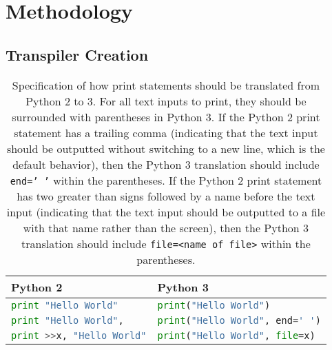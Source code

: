 \section{Methodology}

\subsection{Transpiler Creation}
\begin{table*}[b!]
    \begin{tabular}{@{}l|l@{}}
    \toprule
    Python 2             & Python 3              \\ \midrule
    \lstinline[language=Python, style=pythonstyle]|print "Hello World"|  & \lstinline[language=Python, style=pythonstyle]|print("Hello World")|  \\
    \lstinline[language=Python, style=pythonstyle]|print "Hello World",| & \lstinline[language=Python, style=pythonstyle]|print("Hello World", end=' ')| \\
    \lstinline[language=Python, style=pythonstyle]|print >>x, "Hello World"|       & \lstinline[language=Python, style=pythonstyle]|print("Hello World", file=x)|\\  \bottomrule      
    \end{tabular}
    \caption{Specification of how print statements should be translated from Python 2 to 3. For all text inputs to print, they should be surrounded with parentheses in Python 3. If the Python 2 print statement has a trailing comma (indicating that the text input should be outputted without switching to a new line, which is the default behavior), then the Python 3 translation should include \texttt{end=' '} within the parentheses. If the Python 2 print statement has two greater than signs followed by a name before the text input (indicating that the text input should be outputted to a file with that name rather than the screen), then the Python 3 translation should include \texttt{file=<name of file>} within the parentheses.}
    \label{tab:python-print-specification}
\end{table*}

